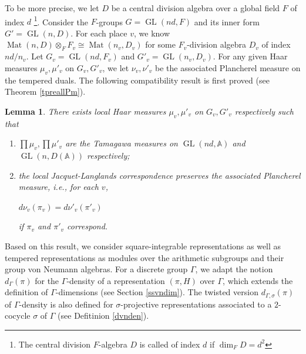 \documentclass[11pt]{article}
\theoremstyle{plain}
\newtheorem{lemma}[theorem]{Lemma}
\theoremstyle{remark}
\theoremstyle{definition}
\DeclareMathOperator{\GL}{GL}
\DeclareMathOperator{\Mt}{Mat}
\begin{document}
To be more precise, we let $D$ be a central division algebra over a global field $F$ of index $d$ 
\footnote{The central division $F$-algebra $D$ is called of index $d$ if $\dim_F D=d^2$}. 
Consider the $F$-groups $G=\GL(nd,F)$ and its inner form $G'=\GL(n,D)$. 
For each place $v$, we know $\Mt(n,D)\otimes_{F}F_v\cong \Mt(n_v,D_v)$ for some $F_v$-division algebra $D_v$ of index $nd/n_v$.  
Let $G_v=\GL(nd,F_v)$ and $G'_v=\GL(n_v,D_v)$. 
For any given Haar measures $\mu_v,\mu'_v$ on $G_v,G'_v$, we let $\nu_v,\nu'_v$ be the associated Plancherel measure on the tempered duals. 
The following compatibility result is first proved (see Theorem \ref{tpreallPm}).
\begin{lemma}\label{lmain1}
There exists local Haar measures $\mu_v,\mu'_v$ on $G_v,G'_v$ respectively such that 
\begin{enumerate}
    \item $\prod \mu_v,\prod \mu'_v$ are the Tamagawa measures on $\GL(nd,\mathbb{A})$ and $\GL(n,D(\mathbb{A}))$ respectively;
    \item the local Jacquet-Langlands correspondence preserves the associated Plancherel measure, i.e., for each $v$, 
    \begin{center}
        $d \nu_{v}(\pi_v)=d \nu'_{v}(\pi'_v)$ 
    \end{center} 
    if $\pi_v$ and $\pi'_v$ correspond. 
\end{enumerate}
\end{lemma}

Based on this result, we consider square-integrable representations as well as tempered representations as modules over the arithmetic subgroups and their group von Neumann algebras. 
For a discrete group $\Gamma$, 
we adapt the notion $d_{\Gamma}(\pi)$ for the $\Gamma$-density of a representation $(\pi,H)$ over $\Gamma$, which extends the definition of $\Gamma$-dimensions (see Section \ref{ssvndim}). 
The twisted version $d_{\Gamma,\sigma}(\pi)$ of $\Gamma$-density is also defined for $\sigma$-projective representations associated to a $2$-cocycle $\sigma$ of $\Gamma$ (see Defitinion \ref{dvnden}).   
\end{document}
